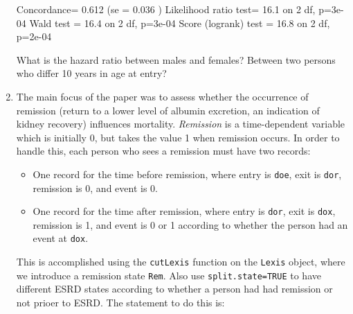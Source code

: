 \documentclass[
]{book}
\newenvironment{Shaded}{\begin{snugshade}}{\end{snugshade}}
\newcommand{\AttributeTok}[1]{\textcolor[rgb]{0.13,0.29,0.53}{#1}}
\newcommand{\CommentTok}[1]{\textcolor[rgb]{0.56,0.35,0.01}{\textit{#1}}}
\newcommand{\ConstantTok}[1]{\textcolor[rgb]{0.56,0.35,0.01}{#1}}
\newcommand{\FunctionTok}[1]{\textcolor[rgb]{0.13,0.29,0.53}{\textbf{#1}}}
\newcommand{\NormalTok}[1]{#1}
\newcommand{\OtherTok}[1]{\textcolor[rgb]{0.56,0.35,0.01}{#1}}
\newcommand{\SpecialCharTok}[1]{\textcolor[rgb]{0.81,0.36,0.00}{\textbf{#1}}}
\newcommand{\StringTok}[1]{\textcolor[rgb]{0.31,0.60,0.02}{#1}}
\providecommand{\tightlist}{%
  \setlength{\itemsep}{0pt}\setlength{\parskip}{0pt}}
\begin{document}
\begin{enumerate}
\begin{Shaded}
\begin{Highlighting}[]
\NormalTok{Concordance= 0.612  (se = 0.036 )}
\NormalTok{Likelihood ratio test= 16.1  on 2 df,   p=3e{-}04}
\NormalTok{Wald test            = 16.4  on 2 df,   p=3e{-}04}
\NormalTok{Score (logrank) test = 16.8  on 2 df,   p=2e{-}04}
\end{Highlighting}
\end{Shaded}

  What is the hazard ratio between males and females?
  Between two persons who differ 10 years in age at entry?
\item
  The main focus of the paper was to assess whether the occurrence of
  remission (return to a lower level of albumin excretion, an
  indication of kidney recovery) influences mortality.
  \emph{Remission} is a time-dependent variable which is initially 0, but
  takes the value 1 when remission occurs. In order to handle this, each
  person who sees a remission must have two records:

  \begin{itemize}
  \tightlist
  \item
    One record for the time before remission, where entry is
    \texttt{doe}, exit is \texttt{dor}, remission is 0, and event is 0.
  \item
    One record for the time after remission, where entry is
    \texttt{dor}, exit is \texttt{dox}, remission is 1, and event is 0
    or 1 according to whether the person had an event at \texttt{dox}.
  \end{itemize}

  This is accomplished using the \texttt{cutLexis} function on the
  \texttt{Lexis} object, where we introduce a remission state \texttt{Rem}.
  Also use \texttt{split.state=TRUE} to
  have different ESRD states according to whether a person had had
  remission or not prioer to ESRD. The statement to do this is:

\begin{Shaded}
\end{Shaded}


\end{enumerate}
\end{document}
